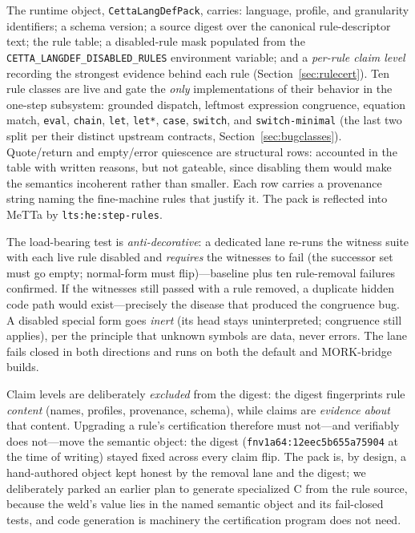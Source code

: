 \documentclass[11pt]{article}
\newcommand{\code}[1]{\texttt{#1}}
\begin{document}
The runtime object, \code{CettaLangDefPack}, carries: language,
profile, and granularity identifiers; a schema version; a source
digest over the canonical rule-descriptor text; the rule table; a
disabled-rule mask populated from the
\code{CETTA\_LANGDEF\_DISABLED\_RULES} environment variable; and a
\emph{per-rule claim level} recording the strongest evidence behind
each rule (Section~\ref{sec:rulecert}).  Ten rule classes are live and
gate the \emph{only} implementations of their behavior in the one-step
subsystem: grounded dispatch, leftmost expression congruence, equation
match, \code{eval}, \code{chain}, \code{let}, \code{let*},
\code{case}, \code{switch}, and \code{switch-minimal} (the last two
split per their distinct upstream contracts,
Section~\ref{sec:bugclasses}).  Quote/return and empty/error
quiescence are structural rows: accounted in the table with written
reasons, but not gateable, since disabling them would make the
semantics incoherent rather than smaller.  Each row carries a
provenance string naming the fine-machine rules that justify it.  The
pack is reflected into MeTTa by \code{lts:he:step-rules}.

The load-bearing test is \emph{anti-decorative}: a dedicated lane
re-runs the witness suite with each live rule disabled and
\emph{requires} the witnesses to fail (the successor set must go
empty; normal-form must flip)---baseline plus ten rule-removal
failures confirmed.  If the witnesses still passed with a rule
removed, a duplicate hidden code path would exist---precisely the
disease that produced the congruence bug.  A disabled special form
goes \emph{inert} (its head stays uninterpreted; congruence still
applies), per the principle that unknown symbols are data, never
errors.  The lane fails closed in both directions and runs on both the
default and MORK-bridge builds.

Claim levels are deliberately \emph{excluded} from the digest: the
digest fingerprints rule \emph{content} (names, profiles, provenance,
schema), while claims are \emph{evidence about} that content.
Upgrading a rule's certification therefore must not---and verifiably
does not---move the semantic object: the digest
(\code{fnv1a64:12eec5b655a75904} at the time of writing) stayed fixed
across every claim flip.  The pack is, by design, a hand-authored
object kept honest by the removal lane and the digest; we deliberately
parked an earlier plan to generate specialized C from the rule source,
because the weld's value lies in the named semantic object and its
fail-closed tests, and code generation is machinery the certification
program does not need.
\end{document}
